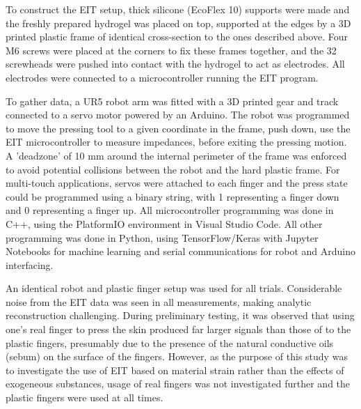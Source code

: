 To construct the EIT setup, thick silicone (EcoFlex 10) supports were made and the freshly prepared hydrogel was placed on top, supported at the edges by a 3D printed plastic frame of identical cross-section to the ones described above. Four M6 screws were placed at the corners to fix these frames together, and the 32 screwheads were pushed into contact with the hydrogel to act as electrodes. All electrodes were connected to a microcontroller running the EIT program.

To gather data, a UR5 robot arm was fitted with a 3D printed gear and track connected to a servo motor powered by an Arduino. The robot was programmed to move the pressing tool to a given coordinate in the frame, push down, use the EIT microcontroller to measure impedances, before exiting the pressing motion. A 'deadzone' of 10 mm around the internal perimeter of the frame was enforced to avoid potential collisions between the robot and the hard plastic frame. For multi-touch applications, servos were attached to each finger and the press state could be programmed using a binary string, with 1 representing a finger down and 0 representing a finger up. All microcontroller programming was done in C++, using the PlatformIO environment in Visual Studio Code. All other programming was done in Python, using TensorFlow/Keras with Jupyter Notebooks for machine learning and serial communications for robot and Arduino interfacing.

An identical robot and plastic finger setup was used for all trials. Considerable noise from the EIT data was seen in all measurements, making analytic reconstruction challenging. During preliminary testing, it was observed that using one's real finger to press the skin produced far larger signals than those of to the plastic fingers, presumably due to the presence of the natural conductive oils (sebum) on the surface of the fingers. However, as the purpose of this study was to investigate the use of EIT based on material strain rather than the effects of exogeneous substances, usage of real fingers was not investigated further and the plastic fingers were used at all times.

